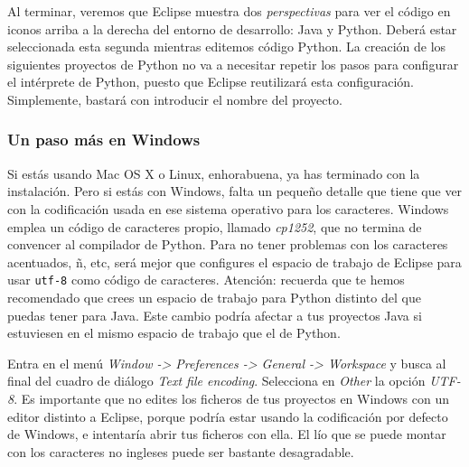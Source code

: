 Al terminar, veremos que Eclipse muestra dos \emph{perspectivas} para ver el código en iconos arriba a la derecha del entorno de desarrollo: Java y Python. Deberá estar seleccionada esta segunda mientras editemos código Python. La creación de los siguientes proyectos de Python no va a necesitar repetir los pasos para configurar el intérprete de Python, puesto que Eclipse reutilizará esta configuración. Simplemente, bastará con introducir el nombre del proyecto.

\subsubsection{Un paso más en Windows}

Si estás usando Mac OS X o Linux, enhorabuena, ya has terminado con la instalación. Pero si estás con Windows, falta un pequeño detalle que tiene que ver con la codificación usada en ese sistema operativo para los caracteres. Windows emplea un código de caracteres propio, llamado \emph{cp1252}, que no termina de convencer al compilador de Python. Para no tener problemas con los caracteres acentuados, ñ, etc, será mejor que configures el espacio de trabajo de Eclipse para usar \texttt{utf-8} como código de caracteres. Atención: recuerda que te hemos recomendado que crees un espacio de trabajo para Python distinto del que puedas tener para Java. Este cambio podría afectar a tus proyectos Java si estuviesen en el mismo espacio de trabajo que el de Python.

Entra en el menú \emph{Window -> Preferences -> General -> Workspace} y busca al final del cuadro de diálogo \emph{Text file encoding}. Selecciona en \emph{Other} la opción \emph{UTF-8}. Es importante que no edites los ficheros de tus proyectos en Windows con un editor distinto a Eclipse, porque podría estar usando la codificación por defecto de Windows, e intentaría abrir tus ficheros con ella. El lío que se puede montar con los caracteres no ingleses puede ser bastante desagradable.
